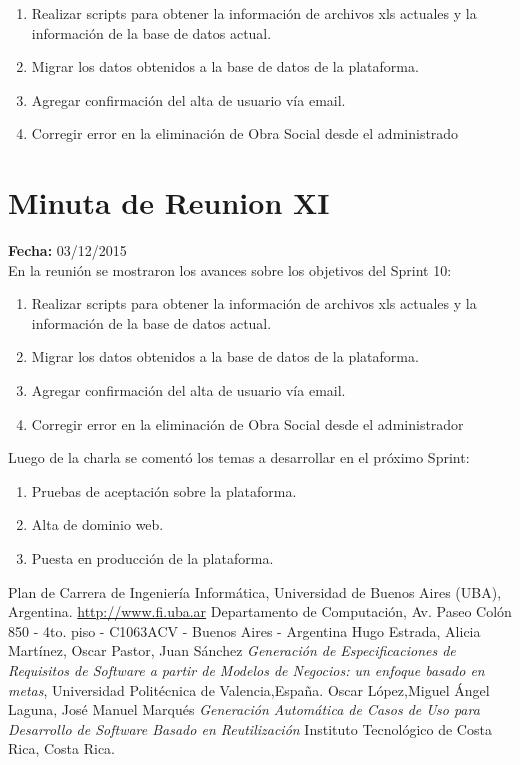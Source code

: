\documentclass[runningheads,a4paper,spanish]{llncs}
\begin{document}
\begin{enumerate}
	\item Realizar scripts para obtener la información de archivos xls actuales y la información de la base de datos actual.
	\item Migrar los datos obtenidos a la base de datos de la plataforma.
	\item Agregar confirmación del alta de usuario vía email.
	\item Corregir error en la eliminación de Obra Social desde el administrado
\end{enumerate}

\section{Minuta de Reunion XI}

\textbf{Fecha: }03/12/2015\\

En la reunión se mostraron los avances sobre los objetivos del Sprint 10:
\begin{enumerate}
\item Realizar scripts para obtener la información de archivos xls actuales y la información de la base de datos actual.	
\item Migrar los datos obtenidos a la base de datos de la plataforma.
\item Agregar confirmación del alta de usuario vía email.
\item Corregir error en la eliminación de Obra Social desde el administrador
\end{enumerate}

\begin{flushleft}
Luego de la charla se comentó los temas a desarrollar en el próximo Sprint:
\end{flushleft}

\begin{enumerate}
	\item Pruebas de aceptación sobre la plataforma.
	\item Alta de dominio web.
	\item Puesta en producción de la plataforma.
\end{enumerate}


\begin{thebibliography}{4}

 Plan de Carrera de Ingeniería Informática, Universidad de Buenos Aires (UBA), Argentina. \url{http://www.fi.uba.ar}
 Departamento de Computación, Av. Paseo Colón 850 - 4to. piso - C1063ACV - Buenos Aires - Argentina
Hugo Estrada, Alicia Martínez, Oscar Pastor, Juan Sánchez
\emph{Generación de Especificaciones de Requisitos de Software a partir de Modelos de Negocios: un enfoque basado en metas},
 Universidad Politécnica de Valencia,España.
Oscar López,Miguel Ángel Laguna, José Manuel Marqués
\emph{Generación Automática de Casos de Uso para Desarrollo de Software Basado en Reutilización}
Instituto Tecnológico de Costa Rica, Costa Rica.

\end{thebibliography}
\end{document}
